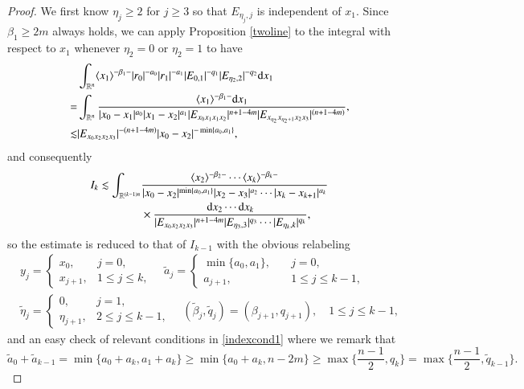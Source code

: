 \documentclass[11pt,reqno]{amsart}
\def\d{{\rm d}}
\numberwithin{equation}{section}
\theoremstyle{definition}
\begin{document}
\begin{proof}
	We first know $\eta_j\geq2$ for $j\geq3$ so that $E_{\eta_j,j}$ is independent of $x_1$. Since $\beta_1\geq2m$ always holds, we can apply Proposition \ref{twoline} to the integral with respect to $x_1$ whenever $\eta_2=0$ or $\eta_2=1$ to have
	\begin{equation}\label{I_kx_1}
		\begin{split}
			&\int_{\mathbb{R}^{n}}\langle x_1\rangle^{-\beta_1-}|r_0|^{-a_0}|r_1|^{-a_1}|E_{0,1}|^{-q_1}|E_{\eta_2,2}|^{-q_2}\d x_1\\
			=&\int_{\mathbb{R}^{n}}\frac{\langle x_1\rangle^{-\beta_1-}\d x_1}{|x_0-x_1|^{a_0}|x_1-x_2|^{a_1}|E_{x_0x_1x_1x_2}|^{n+1-4m}|E_{x_{\eta_2}x_{\eta_2+1}x_2x_3}|^{(n+1-4m)}},\\
			\lesssim&|E_{x_0x_2x_2x_3}|^{-(n+1-4m)}|x_0-x_2|^{-\min\{a_0,a_1\}},
		\end{split}
	\end{equation}
	and consequently
	\begin{equation*}\label{I_kbound}
		\begin{split}
			I_k\lesssim\int_{\mathbb{R}^{(k-1)n}}&\frac{\langle x_2\rangle^{-\beta_2-}\cdots\langle x_k\rangle^{-\beta_k-}}{|x_0-x_2|^{\min\{a_0,a_1\}}|x_2-x_3|^{a_2}\cdots|x_k-x_{k+1}|^{a_k}}\\
			&\times\frac{\d x_2\cdots \d x_k}{|E_{x_0x_2x_2x_3}|^{n+1-4m}|E_{\eta_3,3}|^{q_3}\cdots|E_{\eta_k,k}|^{q_k}},
		\end{split}
	\end{equation*}
	so the estimate is reduced to that of $I_{k-1}$ with the obvious relabeling
	\begin{equation*}
		\begin{gathered}
			y_j=\begin{cases}
				x_0,\quad&j=0,\\
				x_{j+1},&1\leq j\leq k,
			\end{cases}\quad\tilde{a}_j=\begin{cases}
				\min\{a_0,a_1\},\quad&j=0,\\
				a_{j+1},&1\leq j\leq k-1,
			\end{cases}\\
			\tilde{\eta}_j=\begin{cases}
				0,\quad&j=1,\\
				\eta_{j+1},&2\leq j\leq k-1,
			\end{cases}	\quad(\tilde{\beta}_j,\tilde{q}_j)=(\beta_{j+1},q_{j+1}),\quad 1\leq j\leq k-1,
		\end{gathered}
	\end{equation*}
	and an easy check of relevant conditions in \eqref{indexcond1} where we remark that
	\begin{equation*}
		\tilde{a}_0+\tilde{a}_{k-1}=\min\{a_0+a_k,a_1+a_k\}\geq\min\{a_0+a_k,n-2m\}\geq\max\{\mbox{$\frac{n-1}{2}$},q_k\}=\max\{\mbox{$\frac{n-1}{2}$},\tilde{q}_{k-1}\}.
	\end{equation*}
	

\end{proof}
\end{document}

